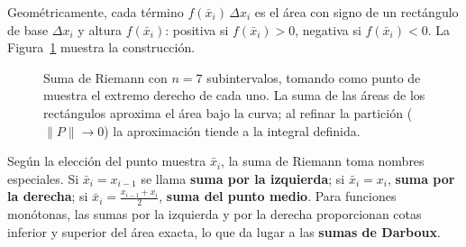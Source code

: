 Geométricamente, cada término $f(\bar{x}_i)\,\Delta x_i$ es el área con signo de un rectángulo de base $\Delta x_i$ y altura $f(\bar{x}_i)$: positiva si $f(\bar{x}_i) > 0$, negativa si $f(\bar{x}_i) < 0$. La Figura~\ref{fig:suma_riemann} muestra la construcción.

\begin{figure}[!htbp]
\centering
{}
\caption{Suma de Riemann con $n=7$ subintervalos, tomando como punto de
muestra el extremo derecho de cada uno. La suma de las áreas de los
rectángulos aproxima el área bajo la curva; al refinar la partición
($\|P\|\to 0$) la aproximación tiende a la integral definida.}
\label{fig:suma_riemann}
\end{figure}

\begin{rem}
Según la elección del punto muestra $\bar{x}_i$, la suma de Riemann toma nombres especiales. Si $\bar{x}_i = x_{i-1}$ se llama \textbf{suma por la izquierda}; si $\bar{x}_i = x_i$, \textbf{suma por la derecha}; si $\bar{x}_i = \frac{x_{i-1}+x_i}{2}$, \textbf{suma del punto medio}. Para funciones monótonas, las sumas por la izquierda y por la derecha proporcionan cotas inferior y superior del área exacta, lo que da lugar a las \textbf{sumas de Darboux}.
\end{rem}

